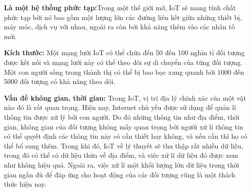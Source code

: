 \textbf{Là một hệ thống phức tạp:}Trong một thế giới mở, IoT sẽ mang tính chất phức tạp bởi nó bao gồm một lượng lớn các đường liên kết giữa những thiết bị, máy móc, dịch vụ với nhau, ngoài ra còn bởi khả năng thêm vào các nhân tố mới.

\textbf{Kích thước: } Một mạng lưới IoT có thể chứa đến 50 đến 100 nghìn tỉ đối tượng được kết nối và mạng lưới này có thể theo dõi sự di chuyển của từng đối tượng. Một con người sống trong thành thị có thể bị bao bọc xung quanh bởi 1000 đến 5000 đối tượng có khả năng theo dõi.

\textbf{Vấn đề không gian, thời gian: }Trong IoT, vị trí địa lý chính xác của một vật nào đó là rất quan trọng. Hiện nay, Internet chủ yếu được sử dụng để quản lí thông tin được xử lý bởi con người. Do đó những thông tin như địa điểm, thời gian, không gian của đối tượng không mấy quan trọng bởi người xử lí thông tin có thể quyết định các thông tin này có cần thiết hay không, và nếu cần thì họ có thể bổ sung thêm. Trong khi đó, IoT về lý thuyết sẽ thu thập rất nhiều dữ liệu, trong đó có thể có dữ liệu thừa về địa điểm, và việc xử lí dữ liệu đó được xem như không hiệu quả. Ngoài ra, việc xử lí một khối lượng lớn dữ liệu trong thời gian ngắn đủ để đáp ứng cho hoạt động của các đối tượng cũng là một thách thức hiện nay.


